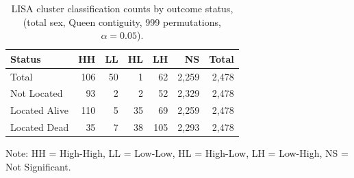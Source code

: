 \begin{table}[htbp]
\centering
\caption{LISA cluster classification counts by outcome status,  (total sex, Queen contiguity, 999 permutations, $\alpha = 0.05$).}\label{tab:lisa_counts}
\begin{tabular}{lrrrrrr}
  \toprule
  \textbf{Status} & \textbf{HH} & \textbf{LL} & \textbf{HL} & \textbf{LH} & \textbf{NS} & \textbf{Total} \\
  \midrule
  Total & 106 & 50 & 1 & 62 & 2,259 & 2,478 \\
  Not Located & 93 & 2 & 2 & 52 & 2,329 & 2,478 \\
  Located Alive & 110 & 5 & 35 & 69 & 2,259 & 2,478 \\
  Located Dead & 35 & 7 & 38 & 105 & 2,293 & 2,478 \\
  \bottomrule
\end{tabular}
\begin{tablenotes}
\small
\item Note: HH = High-High, LL = Low-Low, HL = High-Low, LH = Low-High, NS = Not Significant.
\end{tablenotes}
\end{table}
